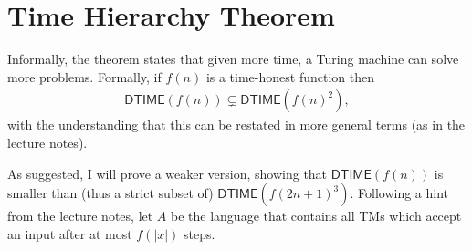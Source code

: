\documentclass{article}
\begin{document}
\section*{Time Hierarchy Theorem}

Informally, the theorem states that given more time, a Turing machine can solve more problems. Formally, if $f(n)$ is a time-honest function then
\begin{align*}
    \mathsf{DTIME}(f(n)) \subsetneq \mathsf{DTIME}\left(f(n)^2 \right),
\end{align*}
with the understanding that this can be restated in more general terms (as in the lecture notes).

As suggested, I will prove a weaker version, showing that $\mathsf{DTIME}(f(n))$ is smaller than (thus a strict subset of) $\mathsf{DTIME}(f(2n + 1)^3)$. Following a hint from the lecture notes, let $A$ be the language that contains all TMs which accept an input after at most $f(|x|)$ steps.
\end{document}
